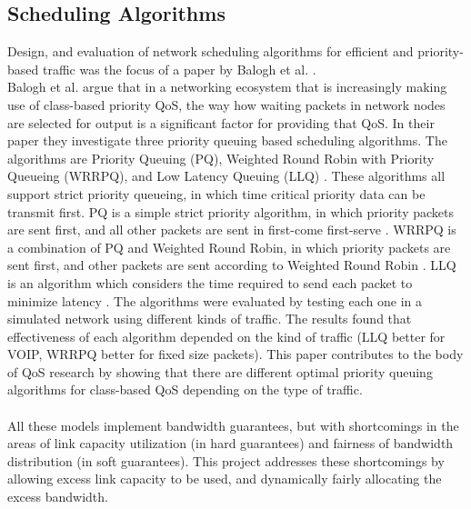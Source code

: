 \documentclass[accepted,single]{gipaper}
\begin{document}
\subsection{Scheduling Algorithms}
\label{algs}

Design, and evaluation of network scheduling algorithms for efficient and priority-based traffic was the focus of a paper by Balogh et al. \cite{Balogh}.
\\


Balogh et al. \cite{Balogh} argue that in a networking ecosystem that is increasingly making use of class-based priority QoS, the way how waiting packets in network nodes are selected for output is a significant factor for providing that QoS. In their paper they investigate three priority queuing based scheduling algorithms. The algorithms are Priority Queuing (PQ), Weighted Round Robin with Priority Queueing (WRRPQ), and Low Latency Queuing (LLQ) \cite{Balogh}. These algorithms all support strict priority queueing, in which time critical priority data can be transmit first. PQ is a simple strict priority algorithm, in which priority packets are sent first, and all other packets are sent in first-come first-serve \cite{Balogh}. WRRPQ is a combination of PQ and Weighted Round Robin, in which priority packets are sent first, and other packets are sent according to Weighted Round Robin \cite{Balogh}. LLQ is an algorithm which considers the time required to send each packet to minimize latency \cite{Balogh}. The algorithms were evaluated by testing each one in a simulated network using different kinds of traffic. The results found that effectiveness of each algorithm depended on the kind of traffic (LLQ better for VOIP, WRRPQ better for fixed size packets). This paper contributes to the body of QoS research by showing that there are different optimal priority queuing algorithms for class-based QoS depending on the type of traffic.
\\\\


\label{prev_work_conclusion}
All these models implement bandwidth guarantees, but with shortcomings in the areas of link capacity utilization (in hard guarantees) and fairness of bandwidth distribution (in soft guarantees). This project addresses these shortcomings by allowing excess link capacity to be used, and dynamically fairly allocating the excess bandwidth.

\end{document}
